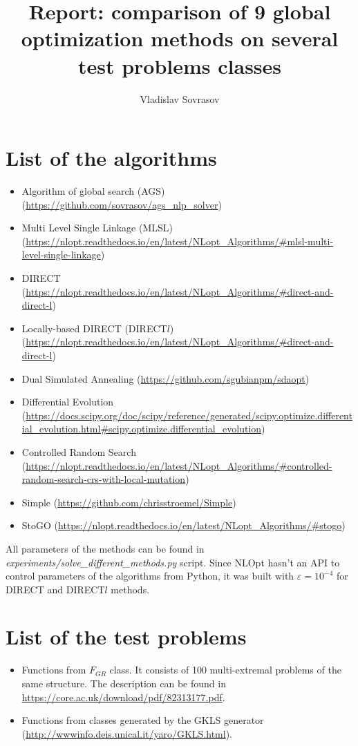 \documentclass[a4paper]{article}
\begin{document}
\title{Report: comparison of 9 global optimization methods on several test problems classes}
\author{Vladislav Sovrasov}
\date{}
\maketitle

\section{List of the algorithms}
\begin{itemize}
  \item Algorithm of global search (AGS) (\url{https://github.com/sovrasov/ags_nlp_solver})
  \item Multi Level Single Linkage (MLSL) (\url{https://nlopt.readthedocs.io/en/latest/NLopt_Algorithms/#mlsl-multi-level-single-linkage})
  \item DIRECT (\url{https://nlopt.readthedocs.io/en/latest/NLopt_Algorithms/#direct-and-direct-l})
  \item Locally-based DIRECT (DIRECT$l$) (\url{https://nlopt.readthedocs.io/en/latest/NLopt_Algorithms/#direct-and-direct-l})
  \item Dual Simulated Annealing (\url{https://github.com/sgubianpm/sdaopt})
  \item Differential Evolution (\url{https://docs.scipy.org/doc/scipy/reference/generated/scipy.optimize.differential_evolution.html#scipy.optimize.differential_evolution})
  \item Controlled Random Search (\url{https://nlopt.readthedocs.io/en/latest/NLopt_Algorithms/#controlled-random-search-crs-with-local-mutation})
  \item Simple (\url{https://github.com/chrisstroemel/Simple})
  \item StoGO (\url{https://nlopt.readthedocs.io/en/latest/NLopt_Algorithms/#stogo})
\end{itemize}

All parameters of the methods can be found in \textit{experiments/solve\_different\_methods.py} script.
Since NLOpt hasn't an API to control parameters of the algorithms from Python, it was built with $\varepsilon=10^{-4}$ for DIRECT and DIRECT$l$ methods.

\section{List of the test problems}

\begin{itemize}
  \item Functions from $F_{GR}$ class. It consists of 100 multi-extremal problems of the same structure. The description can be found in \url{https://core.ac.uk/download/pdf/82313177.pdf}.
  \item Functions from classes generated by the GKLS generator (\url{http://wwwinfo.deis.unical.it/yaro/GKLS.html}).
\end{itemize}
\end{document}
